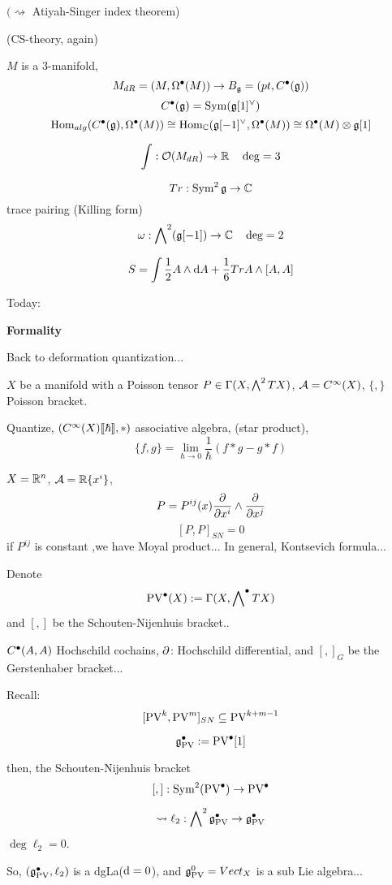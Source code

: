$(\rightsquigarrow$ Atiyah-Singer index theorem)

\begin{example}(CS-theory, again)

$M$ is a $3$-manifold,
$$M_{dR}=(M,\Omega^{\bullet}(M))\to B_{\mathfrak{g}}=(pt,C^{\bullet}(\mathfrak{g}))$$
$$C^{\bullet}(\mathfrak{g})=\operatorname{Sym}(\mathfrak{g}[1]^\vee)$$
$$\operatorname{Hom}_{alg}(C^{\bullet}(\mathfrak{g}),\Omega^{\bullet}(M))
\cong\operatorname{Hom}_{\mathbb{C}}(\mathfrak{g}[-1]^\vee,\Omega^{\bullet}(M))
\cong \Omega^{\bullet}(M)\otimes\mathfrak{g}[1]$$

$$\int:\mathcal{O}(M_{dR})\to\mathbb{R}\quad \deg=3$$

$$Tr:\operatorname{Sym}^2\mathfrak{g}\to\mathbb{C}$$
trace pairing (Killing form)
$$\omega:\bigwedge\nolimits^{2}(\mathfrak{g}[-1])\to\mathbb{C}\quad\deg =2$$

$$S=\int \frac{1}{2}A\wedge\mathrm{d} A
+\frac{1}{6}Tr A\wedge [A,A]$$
\end{example}


Today:

\textbf{Formality}

Back to deformation quantization...

$X$ be a manifold with a Poisson tensor
$P\in\Gamma(X,\bigwedge\nolimits^{2}TX)$,
$\mathcal{A}=C^\infty(X)$, $\{,\}$ Poisson bracket.

Quantize, $(C^\infty(X)[\![\hbar]\!],*)$
associative algebra, (star product),
$$\{f,g\}=\lim_{\hbar\to 0}
\frac{1}{\hbar}
\left(
  f*g-g*f
\right)$$

$X=\mathbb{R}^n$, $\mathcal{A}=\mathbb{R}\{x^i\}$,
$$P=P^{ij}(x)\frac{\partial } {\partial x^i}\wedge\frac{\partial } {\partial x^j}$$
$$[P,P]_{SN}=0$$
if $P^{ij}$ is constant ,we have Moyal product...
In general, Kontsevich formula...

Denote
$$\operatorname{PV}^{\bullet}(X):=\Gamma(X,\bigwedge\nolimits^{\bullet}TX)$$
and $[,]$ be the Schouten-Nijenhuis bracket..

$C^{\bullet}(A,A)$ Hochschild cochains,
$\partial$: Hochschild differential, and $[,]_G$ be the Gerstenhaber bracket...

Recall:
$$[\operatorname{PV}^k,\operatorname{PV}^m]_{SN}\subseteq\operatorname{PV}^{k+m-1}$$

\begin{definition}
$$\mathfrak{g}_{\operatorname{PV}}^{\bullet}:=\operatorname{PV}^{\bullet}[1]$$

then, the Schouten-Nijenhuis bracket
$$[,]:\operatorname{Sym}^2(\operatorname{PV}^{\bullet})\to\operatorname{PV}^{\bullet}$$

$$
  \rightsquigarrow
  \ell_2:\bigwedge\nolimits^{2}\mathfrak{g}_{\operatorname{PV}}^{\bullet}\to\mathfrak{g}_{\operatorname{PV}}^{\bullet}
$$
$\deg\ell_2=0$.
\end{definition}
So, $(\mathfrak{g}_{\operatorname{PV}}^{\bullet},\ell_2)$ is a dgLa($\mathrm{d}=0$),
and $\mathfrak{g}^0_{\operatorname{PV}}=Vect_X$ is a sub Lie algebra...


